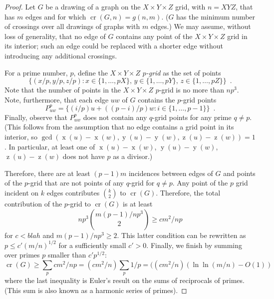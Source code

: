 \documentclass{patmorin}
\DeclareMathOperator{\x}{x}
\DeclareMathOperator{\y}{y}
\DeclareMathOperator{\z}{z}
\DeclareMathOperator{\crs}{cr}
\begin{document}
\begin{proof}
Let $G$ be a drawing of a graph on the $X\times Y\times Z$ grid, with
$n=XYZ$, that has $m$ edges and for which $\crs(G,n)=g(n,m)$. ($G$
has the minimum number of crossings over all drawings of graphs with
$m$ edges.)  We may assume, without loss of generality, that no edge of
$G$ contains any point of the $X\times Y\times Z$ grid in its interior;
such an edge could be replaced with a shorter edge without introducing
any additional crossings.

For a prime number, $p$, define the $X\times Y\times Z$ \emph{$p$-grid}
as the set of points
\[
  \{(x/p,y/p,z/p): x\in\{1,\ldots,pX\},\, y\in\{1,\ldots,pY\},\,
  z\in\{1,\ldots,pZ\}\} \enspace .
\]
Note that the number of points in the $X\times Y\times Z$ $p$-grid is
no more than $np^3$.  Note, furthermore, that each edge $uw$ of $G$
contains the $p$-grid points
\[
    P_{uw}^p = \{ (i/p)u + ((p-i)/p)w : i\in\{1,\ldots,p-1\} \} \enspace .
\]
Finally, observe that $P_{uw}^p$ does not contain any $q$-grid points
for any prime $q\neq p$.  (This follows from the assumption that no edge
contains a grid point in its interior, so $\gcd(\x(u)-\x(w), \y(u)-\y(w),
\z(u)-\z(w))=1$.  In particular, at least one of $\x(u)-\x(w)$,
$\y(u)-\y(w)$, $\z(u)-\z(w)$ does not have $p$ as a divisor.)

Therefore, there are at least $(p-1)m$ incidences between edges of $G$
and points of the $p$-grid that are not points of any $q$-grid for $q\neq p$.
Any point of the $p$ grid incident
on $k$ edges contributes $\binom{k}{2}$ to $\crs(G)$.  Therefore, the
total contribution of the $p$-grid to $\crs(G)$ is at least
\[
    np^3\binom{m(p-1)/np^3}{2} \ge cm^2/np
\]
for $c<blah$ and $m(p-1)/np^3 \ge 2$.  This latter condition can be rewritten
as $p \le c'(m/n)^{1/2}$ for a sufficiently small $c'>0$.
Finally, we finish by summing over primes $p$ smaller than $c'p^{1/2}$:
\[
   \crs(G) \ge \sum_{p} cm^2/np = (cm^2/n) \sum_{p} 1/p = ((cm^2/n)(\ln\ln(m/n)-O(1))
\]
where the last inequality is Euler's result on the sums of reciprocals
of primes. (This sum is also known as a harmonic series of primes).
\end{proof}
\end{document}
